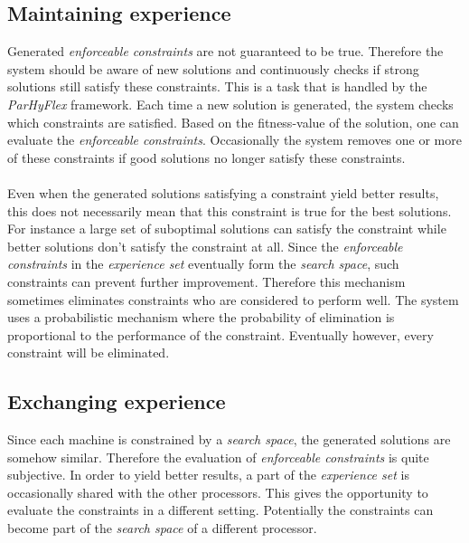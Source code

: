 \documentclass[a4paper,10pt]{article}
\newcommand{\seclab}[1]{\label{sec:#1}}
\newcommand{\ssclab}[1]{\label{ssc:#1}}
\theoremstyle{definition}
\begin{document}
\subsection{Maintaining experience}
\ssclab{maintainingexperience}
Generated \emph{enforceable constraints} are not guaranteed to be true. Therefore the system should be aware of new solutions and continuously checks if strong solutions still satisfy these constraints. This is a task that is handled by the \emph{ParHyFlex} framework. Each time a new solution is generated, the system checks which constraints are satisfied. Based on the fitness-value of the solution, one can evaluate the \emph{enforceable constraints}. Occasionally the system removes one or more of these constraints if good solutions no longer satisfy these constraints.

\paragraph{}
Even when the generated solutions satisfying a constraint yield better results, this does not necessarily mean that this constraint is true for the best solutions. For instance a large set of suboptimal solutions can satisfy the constraint while better solutions don't satisfy the constraint at all. Since the \emph{enforceable constraints} in the \emph{experience set} eventually form the \emph{search space}, such constraints can prevent further improvement. Therefore this mechanism sometimes eliminates constraints who are considered to perform well. The system uses a probabilistic mechanism where the probability of elimination is proportional to the performance of the constraint. Eventually however, every constraint will be eliminated.%

\subsection{Exchanging experience}
\seclab{exchangingexperience}
Since each machine is constrained by a \emph{search space}, the generated solutions are somehow similar. Therefore the evaluation of \emph{enforceable constraints} is quite subjective. In order to yield better results, a part of the \emph{experience set} is occasionally shared with the other processors. This gives the opportunity to evaluate the constraints in a different setting. Potentially the constraints can become part of the \emph{search space} of a different processor.%
\end{document}
